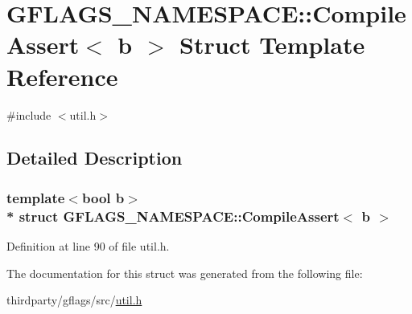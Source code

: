 \hypertarget{structGFLAGS__NAMESPACE_1_1CompileAssert}{}\section{G\+F\+L\+A\+G\+S\+\_\+\+N\+A\+M\+E\+S\+P\+A\+CE\+:\+:Compile\+Assert$<$ b $>$ Struct Template Reference}
\label{structGFLAGS__NAMESPACE_1_1CompileAssert}


{\ttfamily \#include $<$util.\+h$>$}



\subsection{Detailed Description}
\subsubsection*{template$<$bool b$>$\\*
struct G\+F\+L\+A\+G\+S\+\_\+\+N\+A\+M\+E\+S\+P\+A\+C\+E\+::\+Compile\+Assert$<$ b $>$}



Definition at line 90 of file util.\+h.



The documentation for this struct was generated from the following file\+:\begin{DoxyCompactItemize}
\item 
thirdparty/gflags/src/\hyperlink{util_8h}{util.\+h}\end{DoxyCompactItemize}

